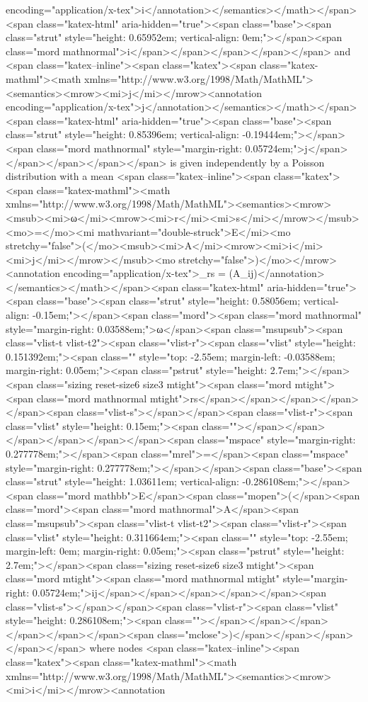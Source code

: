 encoding="application/x-tex">i</annotation></semantics></math></span><span class="katex-html" aria-hidden="true"><span class="base"><span class="strut" style="height: 0.65952em; vertical-align: 0em;"></span><span class="mord mathnormal">i</span></span></span></span></span> and <span class="katex--inline"><span class="katex"><span class="katex-mathml"><math xmlns="http://www.w3.org/1998/Math/MathML"><semantics><mrow><mi>j</mi></mrow><annotation encoding="application/x-tex">j</annotation></semantics></math></span><span class="katex-html" aria-hidden="true"><span class="base"><span class="strut" style="height: 0.85396em; vertical-align: -0.19444em;"></span><span class="mord mathnormal" style="margin-right: 0.05724em;">j</span></span></span></span></span> is given independently by a Poisson distribution with a mean <span class="katex--inline"><span class="katex"><span class="katex-mathml"><math xmlns="http://www.w3.org/1998/Math/MathML"><semantics><mrow><msub><mi>ω</mi><mrow><mi>r</mi><mi>s</mi></mrow></msub><mo>=</mo><mi mathvariant="double-struck">E</mi><mo stretchy="false">(</mo><msub><mi>A</mi><mrow><mi>i</mi><mi>j</mi></mrow></msub><mo stretchy="false">)</mo></mrow><annotation encoding="application/x-tex">\omega_{rs} = (A_{ij})</annotation></semantics></math></span><span class="katex-html" aria-hidden="true"><span class="base"><span class="strut" style="height: 0.58056em; vertical-align: -0.15em;"></span><span class="mord"><span class="mord mathnormal" style="margin-right: 0.03588em;">ω</span><span class="msupsub"><span class="vlist-t vlist-t2"><span class="vlist-r"><span class="vlist" style="height: 0.151392em;"><span class="" style="top: -2.55em; margin-left: -0.03588em; margin-right: 0.05em;"><span class="pstrut" style="height: 2.7em;"></span><span class="sizing reset-size6 size3 mtight"><span class="mord mtight"><span class="mord mathnormal mtight">rs</span></span></span></span></span><span class="vlist-s">​</span></span><span class="vlist-r"><span class="vlist" style="height: 0.15em;"><span class=""></span></span></span></span></span></span><span class="mspace" style="margin-right: 0.277778em;"></span><span class="mrel">=</span><span class="mspace" style="margin-right: 0.277778em;"></span></span><span class="base"><span class="strut" style="height: 1.03611em; vertical-align: -0.286108em;"></span><span class="mord mathbb">E</span><span class="mopen">(</span><span class="mord"><span class="mord mathnormal">A</span><span class="msupsub"><span class="vlist-t vlist-t2"><span class="vlist-r"><span class="vlist" style="height: 0.311664em;"><span class="" style="top: -2.55em; margin-left: 0em; margin-right: 0.05em;"><span class="pstrut" style="height: 2.7em;"></span><span class="sizing reset-size6 size3 mtight"><span class="mord mtight"><span class="mord mathnormal mtight" style="margin-right: 0.05724em;">ij</span></span></span></span></span><span class="vlist-s">​</span></span><span class="vlist-r"><span class="vlist" style="height: 0.286108em;"><span class=""></span></span></span></span></span></span><span class="mclose">)</span></span></span></span></span> where nodes <span class="katex--inline"><span class="katex"><span class="katex-mathml"><math xmlns="http://www.w3.org/1998/Math/MathML"><semantics><mrow><mi>i</mi></mrow><annotation 
